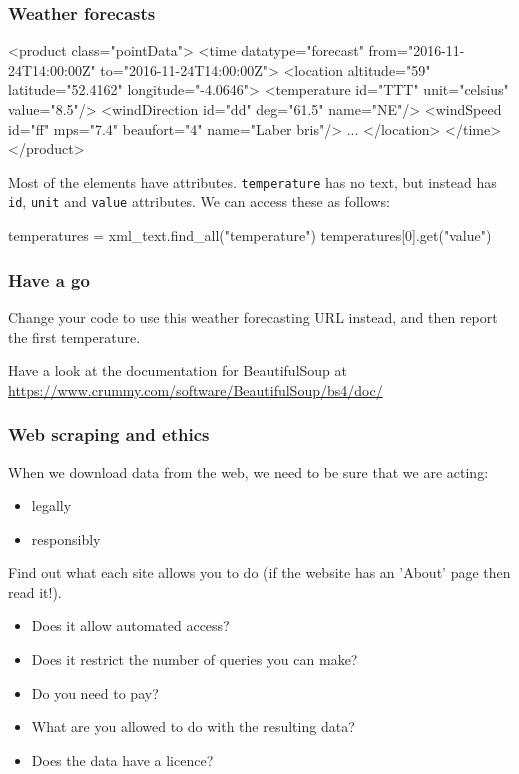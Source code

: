 \documentclass{beamer}
\begin{document}
\begin{frame}[fragile]
\frametitle{Weather forecasts}

\begin{small}
\begin{code} 
  <product class="pointData">
      <time datatype="forecast" from="2016-11-24T14:00:00Z" 
                to="2016-11-24T14:00:00Z">
         <location altitude="59" latitude="52.4162" 
                          longitude="-4.0646">
            <temperature id="TTT" unit="celsius" value="8.5"/>
            <windDirection id="dd" deg="61.5" name="NE"/>
            <windSpeed id="ff" mps="7.4" beaufort="4" 
                                name="Laber bris"/>
            ... 
       </location>
      </time>
   </product>
\end{code}
\end{small}

Most of the elements have attributes. 
\texttt{temperature} has no text, but instead has \texttt{id}, \texttt{unit} and \texttt{value} attributes. 
We can access these as follows:
\begin{code}
temperatures = xml_text.find_all("temperature")
temperatures[0].get("value")
\end{code}
\end{frame}


\begin{frame}[fragile]
\frametitle{Have a go}
Change your code to use this weather forecasting URL instead, and then report the first temperature.

\bigskip

Have a look at the documentation for BeautifulSoup at \url{https://www.crummy.com/software/BeautifulSoup/bs4/doc/}
\end{frame}



\begin{frame}[fragile]
\frametitle{Web scraping and ethics}
When we download data from the web, we need to be sure that we are
acting:
\begin{itemize}
\item legally
\item responsibly
\end{itemize}

Find out what each site allows you to do (if the website has an 'About' page then read it!).
\begin{itemize}
\item Does it allow automated access? 
\item Does it restrict the number of queries you can make? 
\item Do you need to pay? 
\item What are you allowed to do with the resulting data? 
\item Does the data have a licence?
\end{itemize}
\end{frame}
\end{document}
